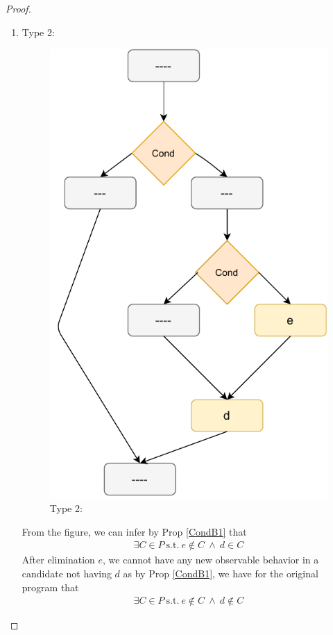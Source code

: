 \begin{proof}
\begin{itemize}
\begin{enumerate}
                        \item Type 2: 

                            \begin{figure}[H]
                                \centering 
                                \includegraphics[scale=0.7]{Elimination/ConditionalsProofFig2.pdf}
                                \caption{Type 2:}    
                            \end{figure}
                        
                            From the figure, we can infer by Prop \ref{CondB1} that
                            \begin{align*}
                                \exists C \in P \ \text{s.t.} \ e \notin C \ \wedge \ d \in C
                            \end{align*}
                            After elimination $e$, we cannot have any new observable behavior in a candidate not having $d$ as by Prop \ref {CondB1}, we have for the original program that  
                            \begin{align*}
                                \exists C \in P \ \text{s.t.} \ e \notin C \ \wedge \ d \notin C
                            \end{align*}


\end{enumerate}
\end{itemize}
\end{proof}
